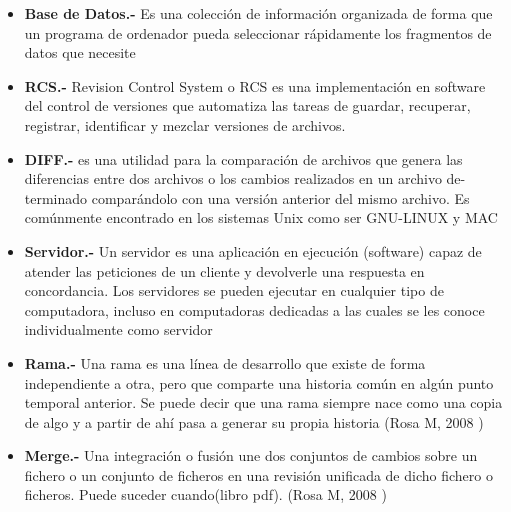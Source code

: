 \documentclass[a4paper,12pt]{article}
\begin{document}
{\begin{itemize}
	\item \textbf{Base de Datos.- }Es una colección de información organizada de forma que un programa de ordenador pueda seleccionar rápidamente los fragmentos de datos que necesite 
	
	\item \textbf{RCS.- } Revision Control System o RCS es una implementación en software del control de versiones que automatiza las tareas de guardar, recuperar, registrar, identificar y mezclar versiones de archivos.
	
	\item \textbf{DIFF.- }es una utilidad para la comparación de archivos que genera las diferencias entre dos archivos o los cambios realizados en un archivo de-terminado comparándolo con una versión anterior del mismo archivo. Es comúnmente encontrado en los sistemas Unix como ser GNU-LINUX y MAC
	
	\item \textbf{Servidor.- } Un servidor es una aplicación en ejecución (software) capaz de atender las peticiones de un cliente y devolverle una respuesta en concordancia. Los servidores se pueden ejecutar en cualquier tipo de computadora, incluso en computadoras dedicadas a las cuales se les conoce individualmente como servidor
	
	\item \textbf{Rama.- }Una rama es una línea de desarrollo que existe de forma independiente a otra, pero
	que comparte una historia común en algún punto temporal anterior. Se puede decir que una rama
	siempre nace como una copia de algo y a partir de ahí pasa a generar su propia historia (Rosa M, 2008 )

	\item \textbf{Merge.- }	
	Una integración o fusión une dos conjuntos de cambios sobre un fichero o un conjunto de ficheros en una revisión unificada de dicho fichero o ficheros. Puede suceder cuando(libro pdf). (Rosa M, 2008 )
	
\end{itemize}

\newpage







}
\end{document}
